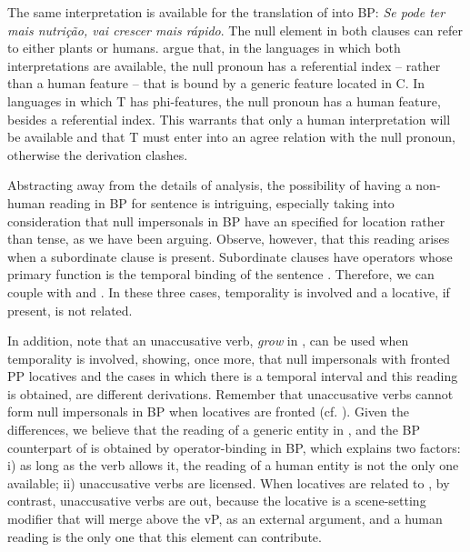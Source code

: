 \documentclass[output=paper]{LSP/langsci}
\begin{document}
The same interpretation is available for the translation of  into BP: \textit{Se pode ter mais nutrição, vai crescer mais rápido}. The null element in both clauses can refer to either plants or humans. \citet{HolmbergEtAl2015} argue that, in the languages in which both interpretations are available, the null pronoun has a referential index -- rather than a human feature -- that is bound by a generic feature located in C. In languages in which T has phi-features, the null pronoun has a human feature, besides a referential index. This warrants that only a human interpretation will be available and that T must enter into an agree relation with the null pronoun, otherwise the derivation clashes.

Abstracting away from the details of  analysis, the possibility of having a non-human reading in BP for sentence  is intriguing, especially taking into consideration that null impersonals in BP have an  specified for location rather than tense, as we have been arguing. Observe, however, that this reading arises when a subordinate clause is present. Subordinate clauses have operators whose primary function is the temporal binding of the sentence \citep{Gueron1982}. Therefore, we can couple  with  and . In these three cases, temporality is involved and a locative, if present, is not  related.

In addition, note that an unaccusative verb, \textit{grow} in , can be used when temporality is involved, showing, once more, that null impersonals with fronted PP locatives and the cases in which there is a temporal interval and this reading is obtained, are different derivations. Remember that unaccusative verbs cannot form null impersonals in BP when locatives are fronted (cf. ). Given the differences, we believe that the reading of a generic entity in ,  and the BP counterpart of  is obtained by operator-binding in BP, which explains two factors: i) as long as the verb allows it, the reading of a human entity is not the only one available; ii) unaccusative verbs are licensed. When locatives are related to , by contrast, unaccusative verbs are out, because the locative is a scene-setting modifier that will merge above the vP, as an external argument, and a  human reading is the only one that this element can contribute.
\end{document}
